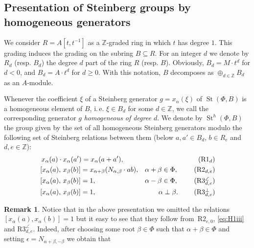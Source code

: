 \documentclass[10pt,a4paper,twoside]{article}
\theoremstyle{remark}
\theoremstyle{definition}
\numberwithin{lemma}{section}
\numberwithin{prop}{section}
\numberwithin{corollary}{section}
\numberwithin{externaltheorem}{section}
\newtheorem{rem}[lemma]{Remark}
\DeclareMathOperator{\St}{St}
\newcommand{\inv}{^{-1}}
\numberwithin{equation}{section}
\begin{document}
\subsection{Presentation of Steinberg groups by homogeneous generators}
\label{sec:presentation}
We consider $R = A[t, t\inv]$ as a $\mathbb{Z}$-graded ring in which $t$ has degree $1$. This grading induces the grading on the subring $B \subseteq R$. For an integer $d$ we denote by $R_d$ (resp. $B_d$) the degree $d$ part of the ring $R$ (resp. $B$). Obviously, $B_d=M \cdot t^d$ for $d<0$, and $B_d=A \cdot t^d$ for $d\geq0$. With this notation, $B$ decomposes as $\oplus_{d\in\mathbb Z}B_d$ as an $A$-module. 

Whenever the coefficient $\xi$ of a Steinberg generator $g = x_\alpha(\xi)$ of $\St(\Phi, B)$ is a homogeneous element of $B$, i.\,e. $\xi \in B_d$ for some $d \in \mathbb{Z}$,
 we call the corresponding generator $g$ {\it homogeneous of degree $d$}.
We denote by $\St^h(\Phi, B)$ the group given by the set of all homogeneous Steinberg generators modulo the following set of Steinberg relations between them
(below $a, a' \in B_d$, $b\in R_e$ and $d,e \in \mathbb{Z}$): 
\begin{align}
&\,\,x_{\alpha}(a)\cdot x_{\alpha}(a') =  x_{\alpha}(a+a'),                        & \tag{R$1_d$} \\
&\,[x_{\alpha}(a),\,x_{\beta}(b)]= x_{\alpha+\beta}(N_{\alpha, \beta} \cdot ab),   & \alpha + \beta \in \Phi,\ \tag{R$2_{d,e}$} \\
&\,[x_{\alpha}(a),\,x_{\beta}(b)]= 1,                                              & \alpha - \beta \in \Phi,\ \tag{R$3^\angle_{d,e}$} \\
&\,[x_{\alpha}(a),\,x_{\beta}(b)]= 1,                                              & \alpha \perp \beta.\ \tag{R$3^\bot_{d,e}$}
\end{align}
\begin{rem}
Notice that in the above presentation we omitted the relations $[x_\alpha(a), x_\alpha(b)] = 1$ but it easy to see that they follow from~$\text{R2}_{e,0}$, \eqref{eq:H1iii} and $\text{R3}_{d,e}^\angle$. Indeed, after choosing some root $\beta\in \Phi$ such that $\alpha+\beta\in\Phi$ and setting $\epsilon = N_{\alpha+\beta,-\beta}$ we obtain that 
\newline{}
\end{rem}
\end{document}
